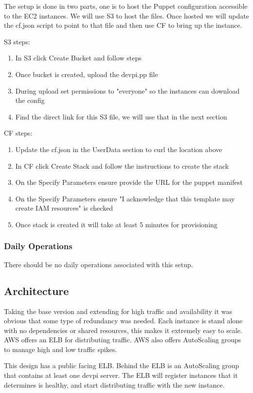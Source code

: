 \documentclass[12pt, letterpaper]{article}
\begin{document}
The setup is done in two parts, one is to host the Puppet configuration accessible to the EC2 instances. We will use
S3 to host the files. Once hosted we will update the cf.json script to point to that file and then use CF to bring
up the instance.

S3 steps:
\begin{enumerate}
    \item In S3 click Create Bucket and follow steps
    \item Once bucket is created, upload the devpi.pp file
    \item During upload set permissions to "everyone" so the instances can download the config
    \item Find the direct link for this S3 file, we will use that in the next section
\end{enumerate}

CF steps:
\begin{enumerate}
    \item Update the cf.json in the UserData section to curl the location above
    \item In CF click Create Stack and follow the instructions to create the stack
    \item On the Specify Parameters ensure provide the URL for the puppet manifest  
    \item On the Specify Parameters ensure "I acknowledge that this template may create IAM resources" is checked
    \item Once stack is created it will take at least 5 minutes for provisioning
\end{enumerate}

\subsubsection{Daily Operations}
There should be no daily operations associated with this setup.

\subsection{Architecture}
Taking the base version and extending for high traffic and availability it was obvious that some type of redundancy was needed. 
Each instance is stand alone with no dependencies or shared resources, this makes it extremely easy to scale. AWS offers an 
ELB for distributing traffic. AWS also offers AutoScaling groups to manage high and low traffic spikes.

This design has a public facing ELB. Behind the ELB is an AutoScaling group that contains at least one devpi
server. The ELB will register instances that it determines is healthy, and start distributing traffic with the new instance.   
\end{document}
